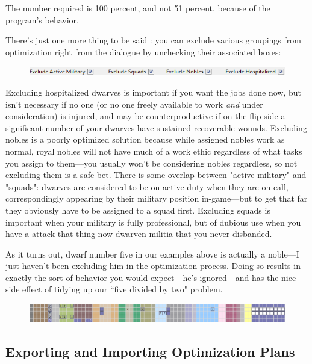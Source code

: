 \documentclass[]{article}
\begin{document}
The number required is 100 percent, and not 51 percent, because of the program's behavior.

There's just one more thing to be said%
: you can exclude various groupings from optimization right from the dialogue by unchecking their
associated boxes:
\begin{figure}[h!] \centering \includegraphics[scale=1]{Sec4Fig6}
\end{figure}

Excluding hospitalized dwarves is important if you want the jobs done now, but isn't necessary if no one
(or no one freely available to work \emph{and} under consideration) is injured, and may be
counterproductive if on the flip side a significant number of your dwarves have sustained recoverable
wounds. Excluding nobles is a poorly optimized solution because while assigned nobles work as normal,
royal nobles will not have much of a work ethic regardless of what tasks you assign to them---you usually
won't be considering nobles regardless, so not excluding them is a safe bet. There is some overlap
between "active military" and "squads": dwarves are considered to be on active duty when they are on
call, correspondingly appearing by their military position in-game---but to get that far they obviously
have to be assigned to a squad first. Excluding squads is important when your military is fully
professional, but of dubious use when you have a attack-that-thing-now dwarven militia that you never
disbanded.

As it turns out, dwarf number five in our examples above is actually a noble---I just haven't been
excluding him in the optimization process. Doing so results in exactly the sort of behavior you would
expect---he's ignored---and has the nice side effect of tidying up our ``five divided by two" problem.
\begin{figure}[h!] \centering \includegraphics[width=\linewidth]{Sec4Fig15}
\end{figure}

\subsection{Exporting and Importing Optimization Plans}
\label{sec:Exporting and Importing Optimization Plans}
\end{document}
